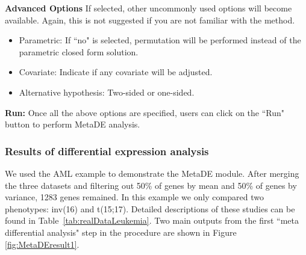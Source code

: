 \begin{steps}
\item \textbf{Advanced Options}
If selected, other uncommonly used options will become available. Again, this is not suggested if you are not familiar with the method.
\begin{itemize}
\item Parametric: If ``no" is selected, permutation will be performed instead of the parametric closed form solution.
\item Covariate: Indicate if any covariate will be adjusted.
\item Alternative hypothesis: Two-sided or one-sided.
\end{itemize}

\item \textbf{Run:}
Once all the above options are specified, users can click on the ``Run" button to perform MetaDE analysis.

\end{steps}

\subsubsection{Results of differential expression analysis}

We used the AML example to demonstrate the MetaDE module.
After merging the three datasets and filtering out 50\% of genes by mean and 50\% of genes by variance, 1283 genes remained.
In this example we only compared two phenotypes: inv(16) and t(15;17).
Detailed descriptions of these studies can be found in Table~\ref{tab:realDataLeukemia}. 
Two main outputs from the first ``meta differential analysis" step in the procedure are shown in Figure \ref{fig:MetaDEresult1}. 


